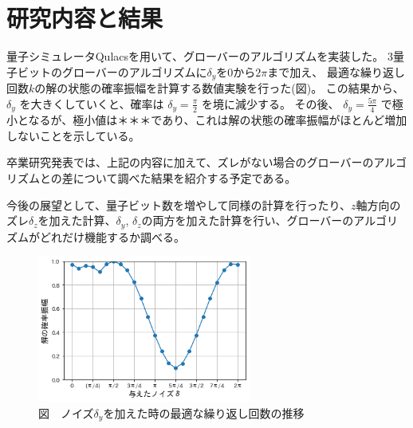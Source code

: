 \documentclass[platex,dvipdfmx, twocolumn]{jsarticle}			%
\begin{document}

\section{研究内容と結果}
量子シミュレータQulacsを用いて、グローバーのアルゴリズムを実装した。
3量子ビットのグローバーのアルゴリズムに$\delta_y$を$0$から$2\pi$まで加え、
最適な繰り返し回数$k$の解の状態の確率振幅を計算する数値実験を行った(図)。
この結果から、$\delta_y$ を大きくしていくと、確率は $\delta_y = \frac{\pi}{2}$ を境に減少する。
その後、 $\delta_y = \frac{5\pi}{4}$ で極小となるが、極小値は＊＊＊であり、これは解の状態の確率振幅がほとんど増加しないことを示している。

卒業研究発表では、上記の内容に加えて、ズレがない場合のグローバーのアルゴリズムとの差について調べた結果を紹介する予定である。

今後の展望として、量子ビット数を増やして同様の計算を行ったり、$z$軸方向のズレ$\delta_z$を加えた計算、$\delta_y$, $\delta_z$の両方を加えた計算を行い、グローバーのアルゴリズムがどれだけ機能するか調べる。

\begin{figure}
\centering
\includegraphics[width=70mm]{figures/sample.png}
\caption*{図　ノイズ$\delta_y$を加えた時の最適な繰り返し回数の推移}
\label{fig:P(k)}
\end{figure}



\end{document}
